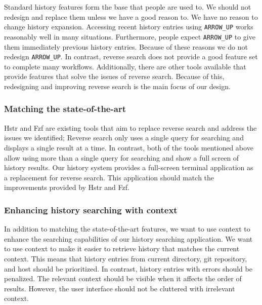 \documentclass[thesis=M,english]{FITthesis}[2012/10/20]
\begin{document}
Standard history features form the base that people are used to. We should not redesign and replace them unless we have a good reason to. We have no reason to change history expansion. Accessing recent history entries using \verb|ARROW_UP| works reasonably well in many situations. Furthermore, people expect \verb|ARROW_UP| to give them immediately previous history entries. Because of these reasons we do not redesign \verb|ARROW_UP|.
In contrast, reverse search does not provide a good feature set to complete many workflows. Additionally, there are other tools available that provide features that solve the issues of reverse search. Because of this, redesigning and improving reverse search is the main focus of our design. 

\subsubsection{Matching the state-of-the-art}

Hstr and Fzf are existing tools that aim to replace reverse search and address the issues we identified; Reverse search only uses a single query for searching and displays a single result at a time. In contrast, both of the tools mentioned above allow using more than a single query for searching and show a full screen of history results.
Our history system provides a full-screen terminal application as a replacement for reverse search. This application should match the improvements provided by Hstr and Fzf. 

\subsubsection{Enhancing history searching with context}

In addition to matching the state-of-the-art features, we want to use context to enhance the searching capabilities of our history searching application.
We want to use context to make it easier to retrieve history that matches the current context. %
This means that history entries from current directory, git repository, and host should be prioritized.
In contrast, history entries with errors should be penalized.
The relevant context should be visible when it affects the order of results.
However, the user interface should not be cluttered with irrelevant context. 
\end{document}

